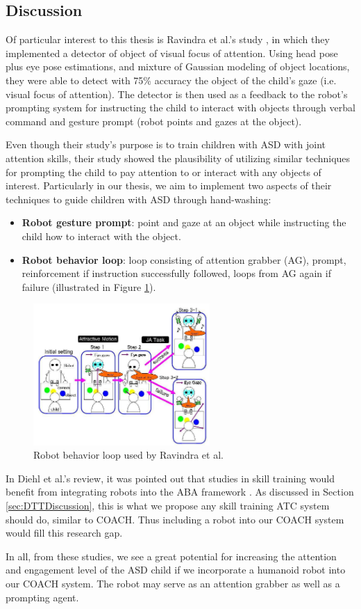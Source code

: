 \subsection{Discussion}
Of particular interest to this thesis is Ravindra et al.'s study \cite{ravindra2009therapeutic}, in which they implemented a detector of object of visual focus of attention.  Using head pose plus eye pose estimations, and mixture of Gaussian modeling of object locations, they were able to detect with 75\% accuracy the object of the child's gaze (i.e. visual focus of attention).  The detector is then used as a feedback to the robot's prompting system for instructing the child to interact with objects through verbal command and gesture prompt (robot points and gazes at the object).


Even though their study's purpose is to train children with ASD with joint attention skills, their study showed the plausibility of utilizing similar techniques for prompting the child to pay attention to or interact with any objects of interest.  Particularly in our thesis, we aim to implement two aspects of their techniques to guide children with ASD through hand-washing:
\begin{itemize}
	\item \textbf{Robot gesture prompt}: point and gaze at an object while instructing the child how to interact with the object.
	\item \textbf{Robot behavior loop}: loop consisting of attention grabber (AG), prompt, reinforcement if instruction successfully followed, loops from AG again if failure (illustrated in Figure \ref{fig:ravindra2009therapeutic}).
\end{itemize}
\begin{figure} [h]
	\centering
	\includegraphics[width=0.6\textwidth]{./img/ravindra2009therapeutic.png}
	\caption{Robot behavior loop used by Ravindra et al. \cite{ravindra2009therapeutic}}
	\label{fig:ravindra2009therapeutic}
\end{figure}

In Diehl et al.'s review, it was pointed out that studies in skill training would benefit from integrating robots into the ABA framework \cite{diehl2012clinical}.  As discussed in Section \ref{sec:DTTDiscussion}, this is what we propose any skill training ATC system should do, similar to COACH.  Thus including a robot into our COACH system would fill this research gap.


In all, from these studies, we see a great potential for increasing the attention and engagement level of the ASD child if we incorporate a humanoid robot into our COACH system.  The robot may serve as an attention grabber as well as a prompting agent.
